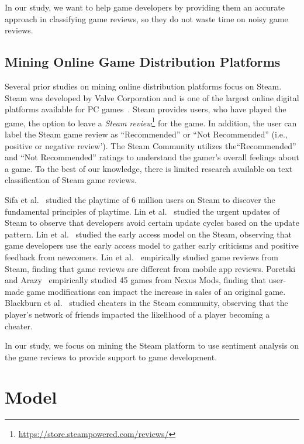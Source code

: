 \documentclass[conference]{IEEEtran}
\begin{document}
In our study, we want to help game developers by providing them an accurate approach in classifying game reviews, so they do not waste time on noisy game reviews.


\subsection{Mining Online Game Distribution Platforms}

Several prior studies on mining online distribution platforms focus on Steam. Steam was developed by Valve Corporation and is one of the largest online digital platforms available for PC games~\cite{lin2019empirical}. Steam provides users, who have played the game, the option to leave a \textit{Steam review}\footnote{\url{https://store.steampowered.com/reviews/}} for the game. In addition, the user can label the Steam game review as ``Recommended'' or ``Not Recommended'' (i.e., positive or negative review'). The Steam Community utilizes the``Recommended'' and ``Not Recommended'' ratings to understand the gamer's overall feelings about a game. To the best of our knowledge, there is limited research available on text classification of Steam game reviews.


Sifa et al.~\cite{theplaytimeprinciple} studied the playtime of 6 million users on Steam to discover the fundamental principles of playtime. Lin et al.~\cite{urgentupdates} studied the urgent updates of Steam to observe that developers avoid certain update cycles based on the update pattern. Lin et al.~\cite{lin2017eag} studied the early access model on the Steam, observing that game developers use the early access model to gather early criticisms and positive feedback from newcomers. Lin et al.~\cite{lin2018gr} empirically studied game reviews from Steam, finding that game reviews are different from mobile app reviews. Poretski and Arazy~\cite{placingvalueoncommunitycocreations} empirically studied 45 games from Nexus Mods, finding that user-made game modifications can impact the increase in sales of an original game. Blackburn et al.~\cite{cheatinginonlinegamesasocialnetwork} studied cheaters in the Steam community, observing that the player's network of friends impacted the likelihood of a player becoming a cheater.


In our study, we focus on mining the Steam platform to use sentiment analysis on the game reviews to provide support to game development.


\section{Model}
\label{sec:model}
\end{document}
